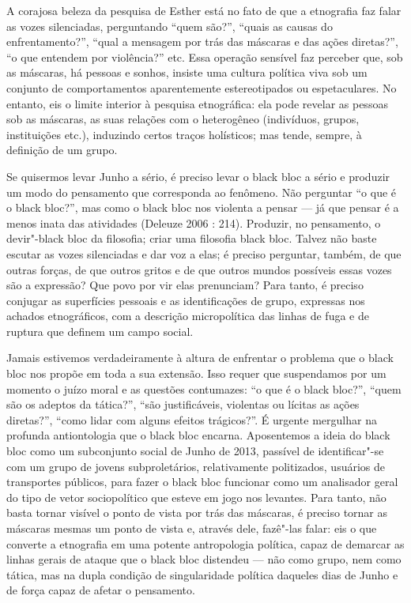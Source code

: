 A corajosa beleza da pesquisa de Esther está no fato de que a etnografia
faz falar as vozes silenciadas, perguntando ``quem são?'', ``quais as
causas do enfrentamento?'', ``qual a mensagem por trás das máscaras e
das ações diretas?'', ``o que entendem por violência?'' etc. Essa
operação sensível faz perceber que, sob as máscaras, há pessoas e
sonhos, insiste uma cultura política viva sob um conjunto de
comportamentos aparentemente estereotipados ou espetaculares. No
entanto, eis o limite interior à pesquisa etnográfica: ela pode revelar
as pessoas sob as máscaras, as suas relações com o heterogêneo
(indivíduos, grupos, instituições etc.), induzindo certos traços
holísticos; mas tende, sempre, à definição de um grupo.

Se quisermos levar Junho a sério, é preciso levar o black bloc a sério e
produzir um modo do pensamento que corresponda ao fenômeno. Não
perguntar ``o que é o black bloc?'', mas como o black bloc nos violenta
a pensar --- já que pensar é a menos inata das atividades (Deleuze 2006
: 214). Produzir, no pensamento, o devir"-black bloc da filosofia; criar
uma filosofia black bloc. Talvez não baste escutar as vozes silenciadas
e dar voz a elas; é preciso perguntar, também, de que outras forças, de
que outros gritos e de que outros mundos possíveis essas vozes são a
expressão? Que povo por vir elas prenunciam? Para tanto, é preciso
conjugar as superfícies pessoais e as identificações de grupo, expressas
nos achados etnográficos, com a descrição micropolítica das linhas de
fuga e de ruptura que definem um campo social.

Jamais estivemos verdadeiramente à altura de enfrentar o problema que o
black bloc nos propõe em toda a sua extensão. Isso requer que
suspendamos por um momento o juízo moral e as questões contumazes: ``o
que é o black bloc?'', ``quem são os adeptos da tática?'', ``são
justificáveis, violentas ou lícitas as ações diretas?'', ``como lidar
com alguns efeitos trágicos?''. É urgente mergulhar na profunda
antiontologia que o black bloc encarna. Aposentemos a ideia do black
bloc como um subconjunto social de Junho de 2013, passível de
identificar"-se com um grupo de jovens subproletários, relativamente
politizados, usuários de transportes públicos, para fazer o black bloc
funcionar como um analisador geral do tipo de vetor sociopolítico que
esteve em jogo nos levantes. Para tanto, não basta tornar visível o
ponto de vista por trás das máscaras, é preciso tornar as máscaras
mesmas um ponto de vista e, através dele, fazê"-las falar: eis o que
converte a etnografia em uma potente antropologia política, capaz de
demarcar as linhas gerais de ataque que o black bloc distendeu --- não
como grupo, nem como tática, mas na dupla condição de singularidade
política daqueles dias de Junho e de força capaz de afetar o pensamento.

